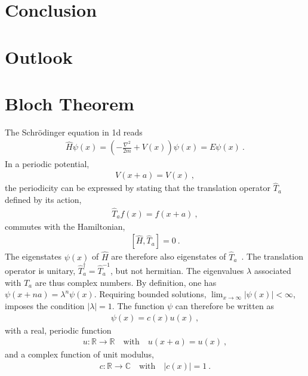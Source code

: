 \documentclass[a4paper,12pt]{book}
\newcommand{\D}[1]{{#1}^\dagger}
\begin{document}
\chapter{Conclusion}

\chapter{Outlook}




\appendix
\chapter{Bloch Theorem}
\label{sec:BlochTheorem}
The Schr\"odinger equation in 1d reads
\begin{align}
	\hat H \psi (x) = \left( - \frac{\nabla^2}{2m} + V(x) \right) \psi (x) = E \psi (x)~.
	\label{eq:app.bloch.se}
\end{align}
In a periodic potential,
\begin{align}
	V(x + a) = V(x)~,
	\label{eq:app.bloch.potential}
\end{align}
the periodicity can be expressed by stating that the translation operator $\hat T_a$ defined by its action,
\begin{align}
	\hat T_a f(x) = f(x + a)~,
	\label{eq:app.bloch.Ta}
\end{align}
commutes with the Hamiltonian,
\begin{align}
	\left[ \hat H , \hat T_a\right] = 0~.
	\label{eq:app.bloch.commute}
\end{align}
The eigenstates $\psi (x)$ of $\hat H$ are therefore also eigenstates of $\hat T_a$~\cite{Basdevant2000}. The translation operator is unitary, $\D{\hat T}_a = \hat{T}_a^{-1}$, but not hermitian. The eigenvalues $\lambda$ associated with $\hat T_a$ are thus complex numbers. By definition, one has \mbox{$\psi ( x + na ) = \lambda^n \psi(x)$}. Requiring bounded solutions, $\lim_{x \rightarrow \infty} \lvert \psi (x) \rvert < \infty$, imposes the condition $\lvert \lambda \rvert = 1$.
The function $\psi$ can therefore be written as
\begin{align}
	\psi (x) = c(x) u(x)~,
\end{align}
with a real, periodic function
\begin{align}
	u: \mathds R \rightarrow \mathds R
	\quad\text{with}\quad u(x + a) = u(x)~,
\end{align}
and a complex function of unit modulus,
\begin{align}
	c: \mathds R \rightarrow \mathds C
	\quad\text{with}\quad \left\lvert c(x) \right\rvert = 1~.
\end{align}
\end{document}
